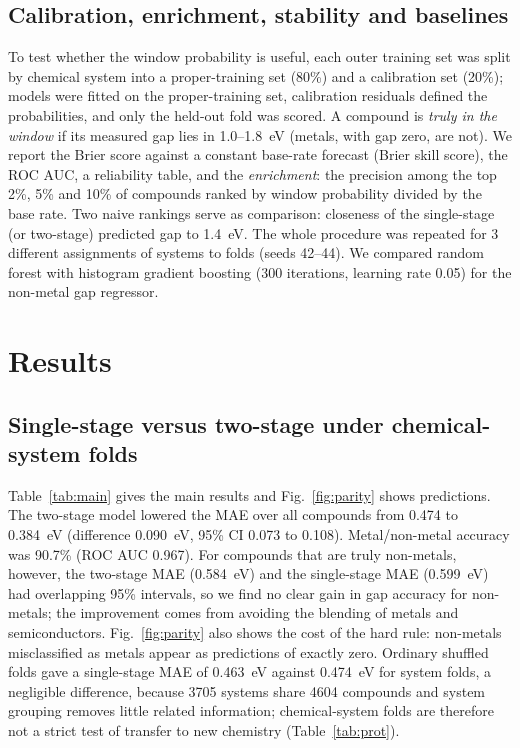 \documentclass[11pt,a4paper]{article}
\begin{document}
\subsection{Calibration, enrichment, stability and baselines}
To test whether the window probability is useful, each outer training set was split by chemical system into a proper-training set (80\%) and a calibration set (20\%); models were fitted on the proper-training set, calibration residuals defined the probabilities, and only the held-out fold was scored.
A compound is \emph{truly in the window} if its measured gap lies in 1.0--1.8~eV (metals, with gap zero, are not). We report the Brier score against a constant base-rate forecast (Brier skill score), the ROC AUC, a reliability table, and the \emph{enrichment}: the precision among the top 2\%, 5\% and 10\% of compounds ranked by window probability divided by the base rate.
Two naive rankings serve as comparison: closeness of the single-stage (or two-stage) predicted gap to 1.4~eV. The whole procedure was repeated for 3 different assignments of systems to folds (seeds 42--44). We compared random forest with histogram gradient boosting (300 iterations, learning rate 0.05) for the non-metal gap regressor.

\section{Results}
\subsection{Single-stage versus two-stage under chemical-system folds}\label{sec:single}
Table~\ref{tab:main} gives the main results and Fig.~\ref{fig:parity} shows predictions. The two-stage model lowered the MAE over all compounds from 0.474 to 0.384~eV
(difference 0.090~eV, 95\% CI 0.073 to 0.108). Metal/non-metal accuracy was 90.7\% (ROC AUC 0.967). For compounds that are truly non-metals, however, the two-stage MAE (0.584~eV) and the single-stage MAE (0.599~eV) had overlapping 95\% intervals, so we find no clear gain in gap accuracy for non-metals; the improvement comes from avoiding the blending of metals and semiconductors.
Fig.~\ref{fig:parity} also shows the cost of the hard rule: non-metals misclassified as metals appear as predictions of exactly zero.
Ordinary shuffled folds gave a single-stage MAE of 0.463~eV against 0.474~eV for system folds, a negligible difference, because 3705 systems share 4604 compounds and system grouping removes little related information;
chemical-system folds are therefore not a strict test of transfer to new chemistry (Table~\ref{tab:prot}).
\end{document}
